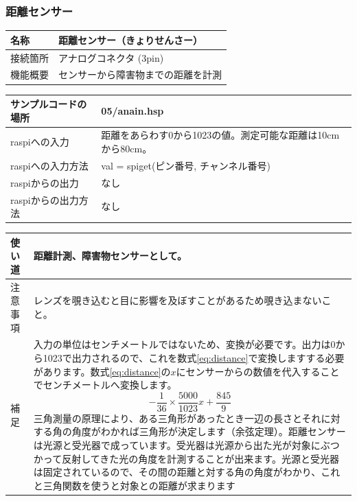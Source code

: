 \subsubsection{距離センサー}\label{distance}
\begin{table}[H]
	\begin{tabular}{|p{\colF}|p{\colG}|} \hline
	名称 & 距離センサー（きょりせんさー）\\ \hline
	接続箇所 & アナログコネクタ (3pin)\\ \hline
	機能概要 & センサーから障害物までの距離を計測\\ \hline
  \end{tabular}
\end{table}

\begin{table}[H]
	\begin{tabular}{|p{\colF}|p{\colG}|}	\hline
	サンプルコードの場所 & 05/anain.hsp\\ \hline
	raspiへの入力 & 距離をあらわす0から1023の値。測定可能な距離は10cmから80cm。\\ \hline
	raspiへの入力方法 & val = spiget(ピン番号, チャンネル番号)\\ \hline
	raspiからの出力 & なし\\ \hline
	raspiからの出力方法 & なし\\ \hline
  \end{tabular}
\end{table}

\begin{table}[H]
	\begin{tabular}{|p{\colF}|p{\colG}|} \hline
	使い道 & 距離計測、障害物センサーとして。\\ \hline
	注意事項 & レンズを覗き込むと目に影響を及ぼすことがあるため覗き込まないこと。\\ \hline
	補足 & 入力の単位はセンチメートルではないため、変換が必要です。出力は0から1023で出力されるので、これを数式\ref{eq:distance}で変換しますする必要があります。数式\ref{eq:distance}の$x$にセンサーからの数値を代入することでセンチメートルへ変換します。
	\begin{equation}
	 -\frac{1}{36} \times \frac{5000}{1023}x + \frac{845}{9}
	 \label{eq:distance}
	\end{equation}
三角測量の原理により、ある三角形があったとき一辺の長さとそれに対する角の角度がわかれば三角形が決定します（余弦定理）。距離センサーは光源と受光器で成っています。受光器は光源から出た光が対象にぶつかって反射してきた光の角度を計測することが出来ます。光源と受光器は固定されているので、その間の距離と対する角の角度がわかり、これと三角関数を使うと対象との距離が求まります\\ \hline
  \end{tabular}
\end{table}

